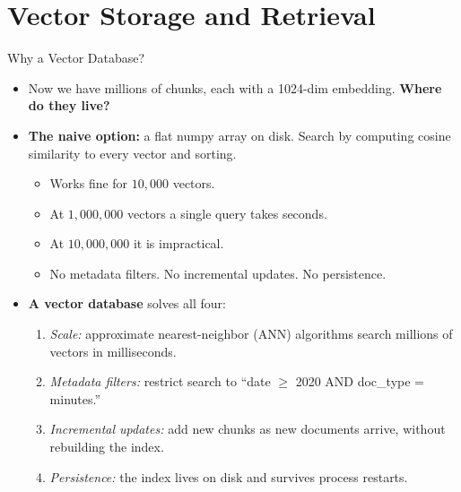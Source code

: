 \documentclass[10pt,english,aspectratio=169]{beamer}
\begin{document}
\section{Vector Storage and Retrieval}

\begin{frame}{Why a Vector Database?}
\begin{itemize}
\item Now we have millions of chunks, each with a 1024-dim embedding. \textbf{Where do they live?}

\medskip
\item \textbf{The naive option:} a flat numpy array on disk. Search by computing cosine similarity to every vector and sorting.
\begin{itemize}
    \item Works fine for $10{,}000$ vectors.
    \item At $1{,}000{,}000$ vectors a single query takes seconds.
    \item At $10{,}000{,}000$ it is impractical.
    \item No metadata filters. No incremental updates. No persistence.
\end{itemize}

\medskip
\item \textbf{A vector database} solves all four:
\begin{enumerate}
    \item \emph{Scale:} approximate nearest-neighbor (ANN) algorithms search millions of vectors in milliseconds.
    \item \emph{Metadata filters:} restrict search to ``date $\geq$ 2020 AND doc\_type = minutes.''
    \item \emph{Incremental updates:} add new chunks as new documents arrive, without rebuilding the index.
    \item \emph{Persistence:} the index lives on disk and survives process restarts.
\end{enumerate}
\end{itemize}
\end{frame}
\end{document}
